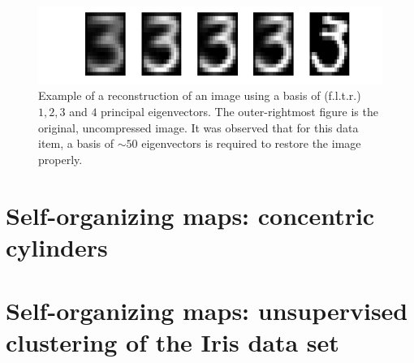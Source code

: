 \documentclass[11pt,a4paper]{article}
\begin{document}

\begin{figure}[htb]
\centering
\includegraphics[width=\textwidth]{figs/reconstruction_steps.png}
\caption{Example of a reconstruction of an image using a basis of (f.l.t.r.) $1,2,3$ and $4$ principal eigenvectors. The outer-rightmost figure is the original, uncompressed image. It was observed that for this data item, a basis of $\sim 50$ eigenvectors is required to restore the image properly.\label{fig:reconstruction_example}}
\end{figure}

\section{Self-organizing maps: concentric cylinders}


\section{Self-organizing maps: unsupervised clustering of the Iris data set}
\end{document}
